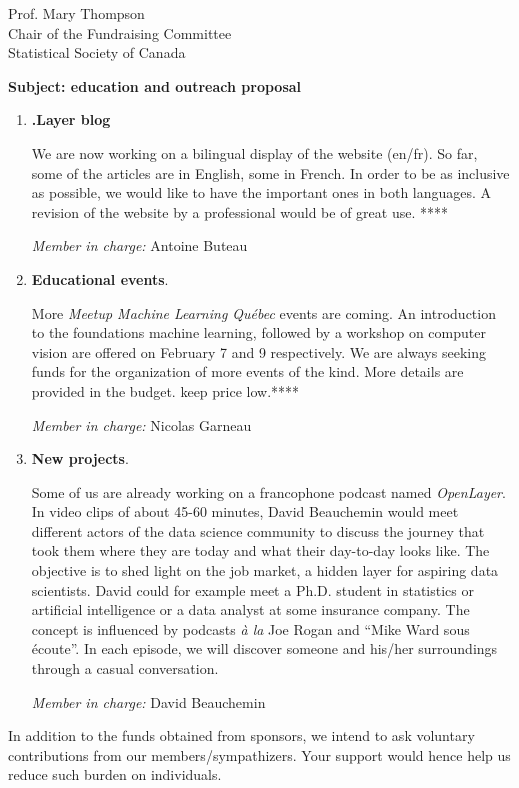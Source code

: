 \documentclass[11pt, a4paper]{letter} %
\begin{document}
\begin{letter}{
	Prof. Mary Thompson\\
	Chair of the Fundraising Committee\\
	Statistical Society of Canada
	
	\bigskip
	\textbf{Subject: education and outreach proposal}%
}
\begin{enumerate}
	\bigskip
	\emph{Member in charge:} Stéphane Caron\\
	
	\item \textbf{.Layer blog}
	
	\quad We are now working on a bilingual display of the website (en/fr). So far, some of the articles are in English, some in French. In order to be as inclusive as possible, we would like to have the important ones in both languages. A revision of the website by a professional would be of great use. ****
	
	\bigskip
	\emph{Member in charge:} Antoine Buteau\\
	
	\item \textbf{Educational events}.
	
	\quad More \emph{Meetup Machine Learning Québec} events are coming. An introduction to the foundations machine learning, followed by a workshop on computer vision are offered on February 7 and 9 respectively. We are always seeking funds for the organization of more events of the kind. More details are provided in the budget. keep price low.****
			
	\bigskip
	\emph{Member in charge:} Nicolas Garneau\\
	
	\item \textbf{New projects}.
	
	\quad Some of us are already working on a francophone podcast named \emph{OpenLayer}. In video clips of about 45-60 minutes, David Beauchemin would meet different actors of the data science community to discuss the journey that took them where they are today and what their day-to-day looks like. The objective is to shed light on the job market, a hidden layer for aspiring data scientists. David could for example meet a Ph.D. student in statistics or artificial intelligence or a data analyst at some insurance company. The concept is influenced by podcasts \emph{à la} Joe Rogan and ``Mike Ward sous écoute''. In each episode, we will discover someone and his/her surroundings through a casual conversation.
	
	\bigskip
	\emph{Member in charge:} David Beauchemin
\end{enumerate}

In addition to the funds obtained from sponsors, we intend to ask voluntary contributions from our members/sympathizers. Your support would hence help us reduce such burden on individuals.



\end{letter}
\end{document}
